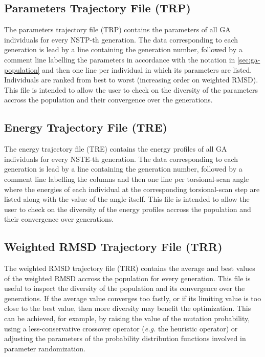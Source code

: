\documentclass[10pt,a4paper,openany]{memoir}
\numberwithin{equation}{section}
\begin{document}
\subsection{Parameters Trajectory File (TRP)}
\label{sec:file-formats-TRP}

The parameters trajectory file (TRP) contains the parameters of all GA
individuals for every NSTP-th generation.  The data corresponding to
each generation is lead by a line containing the generation number,
followed by a comment line labelling the parameters in accordance with
the notation in \autoref{sec:ga-population} and then one line per
individual in which its parameters are listed. Individuals are ranked
from best to worst (increasing order on weighted RMSD). This file is
intended to allow the user to check on the diversity of the parameters
accross the population and their convergence over the generations.

\subsection{Energy Trajectory File (TRE)}
\label{sec:file-formats-TRE}

The energy trajectory file (TRE) contains the energy profiles of all
GA individuals for every NSTE-th generation.  The data corresponding
to each generation is lead by a line containing the generation number,
followed by a comment line labelling the columns and then one line per
torsional-scan angle where the energies of each individual at the
corresponding torsional-scan step are listed along with the value of
the angle itself. This file is intended to allow the user to check on
the diversity of the energy profiles accross the population and their
convergence over generations.

\subsection{Weighted RMSD Trajectory File (TRR)}
\label{sec:file-formats-TRR}

The weighted RMSD trajectory file (TRR) contains the average and best
values of the weighted RMSD accross the population for every
generation.  This file is useful to inspect the diversity of the
population and its convergence over the generations. If the average
value converges too fastly, or if its limiting value is too close to
the best value, then more diversity may benefit the optimization.
This can be achieved, for example, by raising the value of the
mutation probability, using a less-conservative crossover operator
(\textit{e.g.} the heuristic operator) or adjusting the parameters of
the probability distribution functions involved in parameter
randomization.
\end{document}
